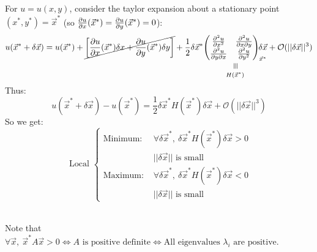 \documentclass[twoside]{scrartcl}
\newcommand{\vertequiv}{\rotatebox{90}{$\,\equiv$}}
\newcommand{\equivto}[2]{\underset{\scriptstyle\overset{\mkern4mu\vertequiv}{#2}}{#1}}
\begin{document}
For $u = u(x,y)$, consider the taylor expansion about a stationary point $(x^*,y^*) = \vec{x}^*$  (so $\frac{\partial u}{\partial x}(\vec{x}^*) = \frac{\partial u}{\partial y}(\vec{x}^*) = 0$):
\[u(\vec{x}^* + \delta \vec{x}) = u(\vec{x}^*) + \cancel{\left[\frac{\del u}{\del x}(\vec{x}^*)\delta x + \frac{\del u}{\del y}(\vec{x}^*)\delta y \right]} 
+ \frac{1}{2} \delta\vec{x}^* \equivto{\begin{pmatrix}
 \frac{\del^2u}{\del x^2} & \frac{\del^2u}{\del x\del y}\\
 \frac{\del^2u}{\del y \del x} &\frac{\del^2u}{\del y^2}	
 \end{pmatrix}_{\vec{x}^*}}{H(\vec{x}^*)}\hspace*{-10pt}\delta \vec{x} + \mathcal{O}(||\delta \vec{x}||^3)
\]
Thus:
\[u(\vec{x}^* + \delta\vec{x}) - u(\vec{x}^*) = \frac{1}{2}\delta \vec{x}^* H(\vec{x}^*) \delta \vec{x} + \mathcal{O}(||\delta \vec{x}||^3)\]
So we get:
\[
\text{ Local }
\begin{cases}
\text{Minimum: } &\forall \delta\vec{x}^*,~\delta \vec{x}^* H(\vec{x}^*) \delta \vec{x} > 0 \\
& ||\delta\vec{x}|| \text{ is small }\\

\text{Maximum: } &\forall \delta\vec{x}^*,~\delta \vec{x}^* H(\vec{x}^*) \delta \vec{x} < 0 \\
& ||\delta\vec{x}|| \text{ is small }

\end{cases}\]~

Note that $\forall \vec{x},~ \vec{x}^*A\vec{x} > 0 \iff A \text{ is positive definite} \iff \text{All eigenvalues } \lambda_i \text{ are positive.}$
\end{document}
